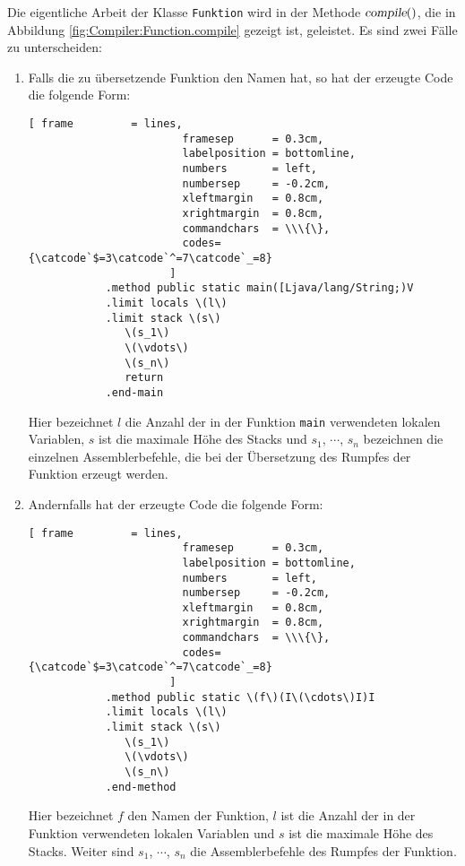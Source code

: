 \vspace*{\fill}
\pagebreak

\vspace*{\fill}
\pagebreak

Die eigentliche Arbeit der Klasse \texttt{Funktion} wird in der Methode $\textsl{compile}()$, die in Abbildung
\ref{fig:Compiler:Function.compile} gezeigt ist, geleistet.  Es sind zwei F\"alle zu unterscheiden:
\begin{enumerate}
\item Falls die zu \"ubersetzende Funktion den Namen  hat, so hat der erzeugte
      Code die folgende Form:

      \begin{Verbatim}[ frame         = lines, 
                        framesep      = 0.3cm, 
                        labelposition = bottomline,
                        numbers       = left,
                        numbersep     = -0.2cm,
                        xleftmargin   = 0.8cm,
                        xrightmargin  = 0.8cm,
                        commandchars  = \\\{\},
                        codes={\catcode`$=3\catcode`^=7\catcode`_=8}
                      ]
            .method public static main([Ljava/lang/String;)V
            .limit locals \(l\) 
            .limit stack \(s\)
               \(s_1\)
               \(\vdots\)
               \(s_n\)
               return
            .end-main
       \end{Verbatim}

       Hier bezeichnet $l$ die Anzahl der in der Funktion \texttt{main} verwendeten lokalen Variablen,
       $s$ ist die maximale H\"ohe des Stacks
       und $s_1$, $\cdots$, $s_n$ bezeichnen die einzelnen Assemblerbefehle, die bei der \"Ubersetzung
       des Rumpfes der Funktion erzeugt werden.

\item Andernfalls hat der erzeugte Code die folgende Form:

      \begin{Verbatim}[ frame         = lines, 
                        framesep      = 0.3cm, 
                        labelposition = bottomline,
                        numbers       = left,
                        numbersep     = -0.2cm,
                        xleftmargin   = 0.8cm,
                        xrightmargin  = 0.8cm,
                        commandchars  = \\\{\},
                        codes={\catcode`$=3\catcode`^=7\catcode`_=8}
                      ]
            .method public static \(f\)(I\(\cdots\)I)I
            .limit locals \(l\) 
            .limit stack \(s\)
               \(s_1\)
               \(\vdots\)
               \(s_n\)
            .end-method
       \end{Verbatim}
       
       Hier bezeichnet $f$ den Namen der Funktion,  $l$ ist die Anzahl der in der Funktion verwendeten lokalen Variablen
       und $s$ ist die maximale H\"ohe des Stacks.
       Weiter sind $s_1$, $\cdots$, $s_n$ die Assemblerbefehle des Rumpfes der Funktion.
\end{enumerate}
